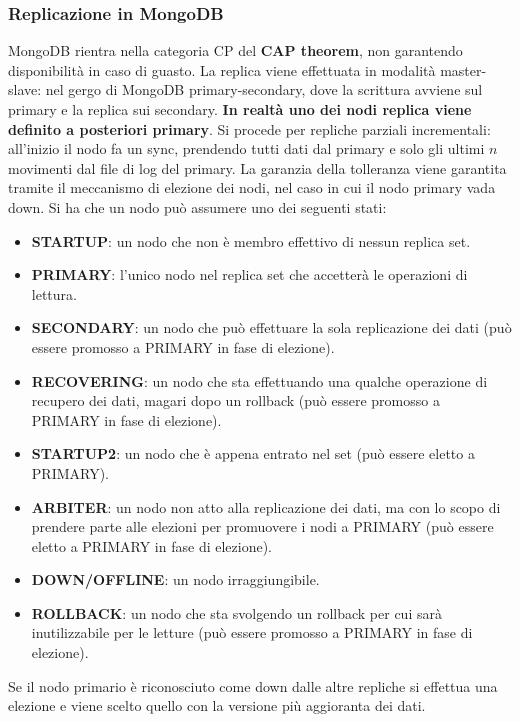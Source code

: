 \subsubsection{Replicazione in MongoDB}
MongoDB rientra nella categoria CP del \textbf{CAP theorem}, non garantendo disponibilità in caso di guasto.
La replica viene effettuata in modalità master-slave: nel gergo di MongoDB primary-secondary, dove la scrittura avviene sul primary e la replica sui secondary. \textbf{In realtà uno dei nodi replica viene definito a posteriori primary}.
Si procede per repliche parziali incrementali: all’inizio il nodo fa un sync, prendendo tutti dati dal primary e solo gli ultimi $n$ movimenti dal file di log del primary.
La garanzia della tolleranza viene garantita tramite il meccanismo di elezione dei nodi, nel caso in cui il nodo primary vada down.
Si ha che un nodo può assumere uno dei seguenti stati:
\begin{itemize}
    \item \textbf{STARTUP}: un nodo che non è membro effettivo di nessun replica set.
    \item \textbf{PRIMARY}: l’unico nodo nel replica set che accetterà le operazioni di lettura.
    \item \textbf{SECONDARY}: un nodo che può effettuare la sola replicazione dei dati (può essere promosso a PRIMARY in fase di elezione).
    \item \textbf{RECOVERING}: un nodo che sta effettuando una qualche operazione di recupero dei dati, magari dopo un rollback (può essere promosso a PRIMARY in fase di elezione).
    \item \textbf{STARTUP2}: un nodo che è appena entrato nel set (può essere eletto a PRIMARY).
    \item \textbf{ARBITER}: un nodo non atto alla replicazione dei dati, ma con lo scopo di prendere parte alle elezioni per promuovere i nodi a PRIMARY (può essere eletto a PRIMARY in fase di elezione).
    \item \textbf{DOWN/OFFLINE}: un nodo irraggiungibile.
    \item \textbf{ROLLBACK}: un nodo che sta svolgendo un rollback per cui sarà inutilizzabile per le letture (può essere promosso a PRIMARY in fase di elezione).
\end{itemize}
Se il nodo primario è riconosciuto come down dalle altre repliche si effettua una elezione e viene scelto quello con la versione più aggioranta dei dati.

